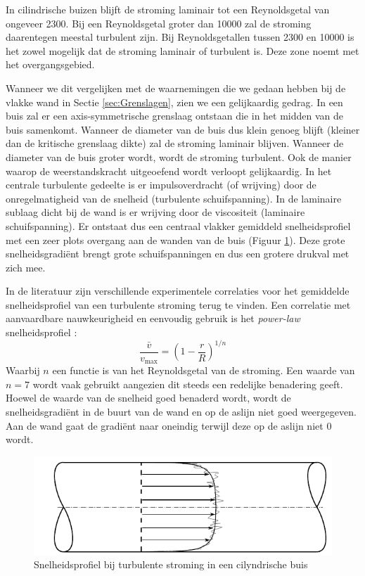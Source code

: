 In cilindrische buizen blijft de stroming laminair tot een Reynoldsgetal van ongeveer 2300. Bij een Reynoldsgetal groter dan 10000 zal de stroming daarentegen meestal turbulent zijn. Bij Reynoldsgetallen tussen 2300 en 10000 is het zowel mogelijk dat de stroming laminair of turbulent is. Deze zone noemt met het overgangsgebied.

Wanneer we dit vergelijken met de waarnemingen die we gedaan hebben bij de vlakke wand in Sectie \ref{sec:Grenslagen}, zien we een gelijkaardig gedrag. In een buis zal er een axis-symmetrische grenslaag ontstaan die in het midden van de buis samenkomt. Wanneer de diameter van de buis dus klein genoeg blijft (kleiner dan de kritische grenslaag dikte) zal de stroming laminair blijven. Wanneer de diameter van de buis groter wordt, wordt de stroming turbulent. Ook de manier waarop de weerstandskracht uitgeoefend wordt verloopt gelijkaardig. In het centrale turbulente gedeelte is er impulsoverdracht (of wrijving) door de onregelmatigheid van de snelheid (turbulente schuifspanning). In de laminaire sublaag dicht bij de wand is er wrijving door de viscositeit (laminaire schuifspanning). Er ontstaat dus een centraal vlakker gemiddeld snelheidsprofiel met een zeer plots overgang aan de wanden van de buis (Figuur \ref{fig:turbulent_snelheidsprofiel}). Deze grote snelheidsgradiënt brengt grote schuifspanningen en dus een grotere drukval met zich mee.

In de literatuur zijn verschillende experimentele correlaties voor het gemiddelde snelheidsprofiel van een turbulente stroming terug te vinden. Een correlatie met aanvaardbare nauwkeurigheid en eenvoudig gebruik is het \emph{power-law} snelheidsprofiel \cite{Munson2010}:
\begin{equation}
	\frac{\bar{v}}{v_{\text{max}}} = \left(1- \frac{r}{R}\right)^{1/n}
\end{equation}
Waarbij $n$ een functie is van het Reynoldsgetal van de stroming. Een waarde van $n=7$ wordt vaak gebruikt aangezien dit steeds een redelijke benadering geeft. Hoewel de waarde van de snelheid goed benaderd wordt, wordt de snelheidsgradiënt in de buurt van de wand en op de aslijn niet goed weergegeven. Aan de wand gaat de gradiënt naar oneindig terwijl deze op de aslijn niet $0$ wordt.
\begin{figure}[htb]
	\centering
	\includegraphics{fig/stroming_in_leidingen/Turbulent_snelheidsprofiel}
	\caption{Snelheidsprofiel bij turbulente stroming in een cilyndrische buis}
	\label{fig:turbulent_snelheidsprofiel}
\end{figure}

